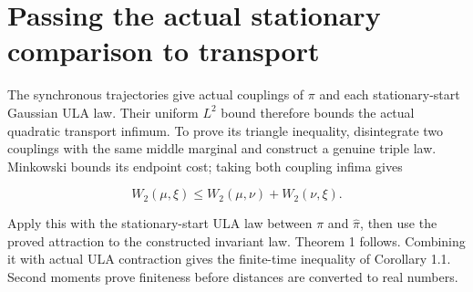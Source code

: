 \documentclass[11pt,a4paper]{article}
\begin{document}
\section{\texorpdfstring{Passing the actual stationary comparison to transport}{Passing the actual stationary comparison to transport}}


The synchronous trajectories give actual couplings of
    \(\pi\) and each stationary-start Gaussian ULA law. Their uniform
    \(L^2\) bound therefore bounds the actual quadratic transport
    infimum. To prove its triangle inequality, disintegrate two couplings
    with the same middle marginal and construct a genuine triple law.
    Minkowski bounds its endpoint cost; taking both coupling infima gives


    \[W_2(\mu,\xi)\le W_2(\mu,\nu)+W_2(\nu,\xi).\]


Apply this with the stationary-start ULA law between \(\pi\) and
    \(\widehat\pi\), then use the proved attraction to the constructed
    invariant law. Theorem 1 follows. Combining it with actual ULA
    contraction gives the finite-time inequality of Corollary 1.1.
    Second moments prove finiteness before distances are converted to
    real numbers.
\end{document}
